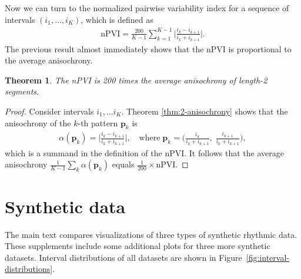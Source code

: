 \documentclass[suppldata]{tMAM2e}%
\newcommand{\vect}[1]{\mathbf{#1}}
\newcommand{\vp}{\vect p}
\theoremstyle{plain}
\newtheorem{theorem}{Theorem}[section]
\theoremstyle{definition}
\theoremstyle{remark}
\begin{document}
Now we can turn to the normalized pairwise variability index for a sequence of intervals $(i_1, \dots, i_K)$, which is defined as
\begin{align}
  \text{nPVI}
  = \frac{200}{K-1} \sum_{k=1}^{K-1}
  \Big| \frac{i_k - i_{k+1}}{i_k + i_{k+1}} \Big|.
\end{align}
The previous result almost immediately shows that the nPVI is proportional to the average anisochrony.

\begin{theorem}
  The nPVI is 200 times the average anisochrony of length-2 segments.
\end{theorem}
\begin{proof}
  Consider intervals $i_1, \dots i_K$.
  Theorem \ref{thm:2-anisochrony} shows that the anisochrony of the $k$-th pattern $\vp_k$ is
  \begin{align}
    \alpha(\vp_k)
    = \Big|
    \frac{i_k - i_{k+1}}{i_k+i_{k+1}}
    \Big|,
    \quad \text{where}\;
    \vp_k = \Big(\frac{i_k}{i_k+i_{k+1}}, \;\frac{i_{k+1}}{i_k+i_{k+1}}\Big),
  \end{align}
  which is a summand in the definition of the nPVI.
  It follows that the average anisochrony $\tfrac{1}{K-1}\sum_k \alpha(\vp_k)$
  equals $\tfrac{1}{200} \times \text{nPVI}$.
\end{proof}


\section{Synthetic data}

The main text compares visualizations of three types of synthetic rhythmic data. 
These supplements include some additional plots for three more synthetic datasets.
Interval distributions of all datasets are shown in Figure~\ref{fig:interval-distributions}.
\end{document}
